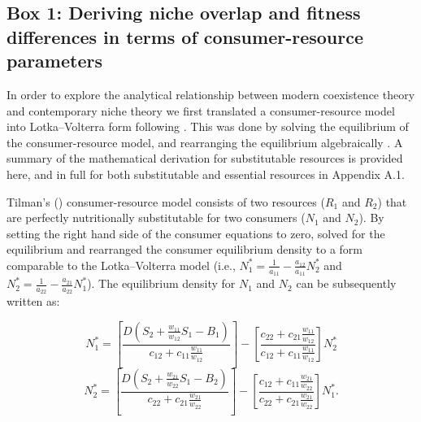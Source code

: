 \clearpage 
\begin{tcolorbox}[breakable, leftright skip=-0.5cm]
\subsection*{Box 1: Deriving niche overlap and fitness differences in terms of consumer-resource parameters}
In order to explore the analytical relationship between modern coexistence theory \citep{Chesson2000} and contemporary niche theory \citep{Chase2003} we first translated a consumer-resource model into Lotka--Volterra form following \citet[][Ch.~7]{tilman1982}. This was done by solving the equilibrium of the consumer-resource model, and rearranging the equilibrium algebraically \citep[for an alternative approach see][]{Meszenaz2006, Barabas2014}. A summary of the mathematical derivation for substitutable resources is provided here, and in full for both substitutable and essential resources in Appendix A.1.
\par


Tilman's (\citeyear{tilman1982}) consumer-resource model consists of two resources ($R_{1}$ and $R_{2}$) that are perfectly nutritionally substitutable for two consumers ($N_{1}$ and $N_{2}$). By setting the right hand side of the consumer equations to zero, \citet{tilman1982} solved for the equilibrium and rearranged the consumer equilibrium density to a form comparable to the Lotka--Volterra model (i.e., $N_{1}^{*}=\frac{1}{a_{11}}-\frac{a_{12}}{a_{11}}N_{2}^{*}$ and $N_{2}^{*}=\frac{1}{a_{22}}-\frac{a_{21}}{a_{22}}N_{1}^{*}$). The equilibrium density for $N_{1}$ and $N_{2}$ can be subsequently written as:

\begin{equation}
N_1^* = \left[ {\frac{{D\left( {{S_2} + \frac{{{w_{11}}}}{{{w_{12}}}}{S_1} - {B_1}} \right)}}{{{c_{12}} + {c_{11}}\frac{{{w_{11}}}}{{{w_{12}}}}}}} \right] - \left[ {\frac{{{c_{22}} + {c_{21}}\frac{{{w_{11}}}}{{{w_{12}}}}}}{{{c_{12}} + {c_{11}}\frac{{{w_{11}}}}{{{w_{12}}}}}}} \right]N_2^*
\tag{2.4.1}\label{eq:2.4.1}
\end{equation}
\begin{equation}
N_2^* = \left[ {\frac{{D\left( {{S_2} + \frac{{{w_{21}}}}{{{w_{22}}}}{S_1} - {B_2}} \right)}}{{{c_{22}} + {c_{21}}\frac{{{w_{21}}}}{{{w_{22}}}}}}} \right] - \left[ {\frac{{{c_{12}} + {c_{11}}\frac{{{w_{21}}}}{{{w_{22}}}}}}{{{c_{22}} + {c_{21}}\frac{{{w_{21}}}}{{{w_{22}}}}}}} \right]N_1^*.
\tag{2.4.2}\label{eq:2.4.2}
\end{equation}


\end{tcolorbox}
